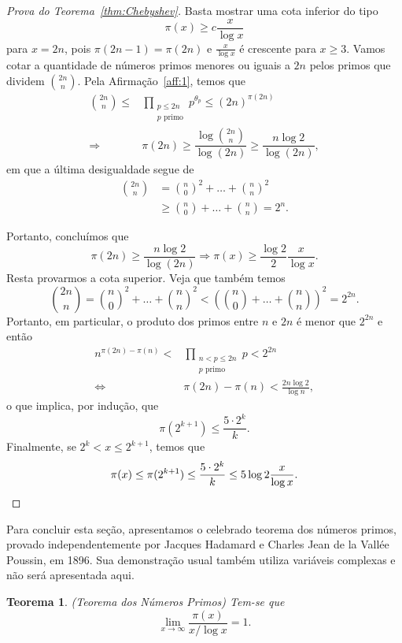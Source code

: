 \documentclass{hipatia}
\newtheorem{theorem*}{Teorema}
\begin{document}
\begin{proof}[Prova do Teorema~\ref{thm:Chebyshev}]
Basta mostrar uma cota inferior do tipo
\[\pi(x) \ge c\frac{x}{\log x}\]
para $x=2n$, pois $\pi(2n-1)=\pi(2n)$ e $\frac{x}{\log x}$ é crescente para $x \ge 3$. Vamos cotar a quantidade de números primos menores ou iguais a $2n$ pelos primos que dividem $\binom{2n}{n}$. Pela Afirmação~\ref{aff:1}, temos que
\begin{align*}\label{eq:4}
\binom{2n}{n}\le&\prod_{\substack{p \le 2n\\p\text{ primo}}} p^{\theta_p}\le (2n)^{\pi(2n)} \\
\Rightarrow &\pi(2n) \ge \dfrac{\log\binom{2n}{n}}{\log (2n)} \ge \dfrac{n\log 2}{\log (2n)},
\end{align*}
em que a última desigualdade segue de 
\begin{align*}
    \binom{2n}{n}&=\binom{n}{0}^2+\ldots+\binom{n}{n}^2\\
    &\ge\binom{n}{0}+\ldots+\binom{n}{n}=2^n.
\end{align*}

Portanto, concluímos que 
\[\pi(2n) \ge  \dfrac{n\log 2}{\log (2n)} \Rightarrow \pi(x) \ge \frac{\log2}{2}\frac{x}{\log x}.\]
Resta provarmos a cota superior. Veja que também temos
\[\binom{2n}{n}=\binom{n}{0}^2+\ldots+\binom{n}{n}^2<\left(\binom{n}{0}+\ldots+\binom{n}{n}\right)^2=2^{2n}.\]
Portanto, em particular, o produto dos primos entre $n$ e $2n$ é menor que $2^{2n}$ e então
\begin{align*}
n^{\pi(2n)-\pi(n)}<& \prod_{\substack{n<p\le 2n\\p\text{ primo}}}p<2^{2n}\\
\iff &\pi(2n)-\pi(n) <\frac{2n\log 2}{\log n},
\end{align*}
o que implica, por indução, que
\[\pi(2^{k+1}) \le \frac{5 \cdot 2^k}{k}.\]
Finalmente, se $2^k < x \le 2^{k+1}$, temos que
\[\pi(x) \le \pi(2^{k+1}) \le \frac{5\cdot 2^k}{k} \le 5\log2\frac{x}{\log x}.\qedhere\]
\end{proof}

Para concluir esta seção, apresentamos o celebrado teorema dos números primos, provado independentemente por Jacques Hadamard e Charles Jean de la Vallée Poussin, em 1896. Sua demonstração usual também utiliza variáveis complexas e não será apresentada aqui.

\begin{theorem*}
(Teorema dos Números Primos) Tem-se que
\[\lim_{x \to \infty} \frac{\pi(x)}{x/\log x}=1.\]
\end{theorem*}
\end{document}
